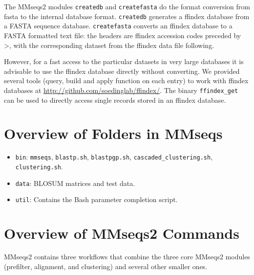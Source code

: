 \documentclass[11pt,a4paper]{scrreprt}
\begin{document}

The MMseqs2 modules \texttt{createdb} and \texttt{createfasta} do the format conversion from fasta to the internal database format. 
\texttt{createdb} generates a ffindex database from a FASTA sequence database. 
\texttt{createfasta} converts an ffindex database to a FASTA formatted text file: the headers are ffindex accession codes preceded by \textgreater, with the corresponding dataset from the ffindex data file following.

However, for a fast access to the particular datasets in very large databases it is advisable to use the ffindex database directly without converting. We provided several tools (query, build and apply function on each entry) to work with ffindex databases at \url{http://github.com/soedinglab/ffindex/}. The binary \texttt{ffindex\_get} can be used to directly access single records stored in an ffindex database.
\section{Overview of Folders in MMseqs}
\begin{itemize}
\item \texttt{bin}: \texttt{mmseqs}, \texttt{blastp.sh}, \texttt{blastpgp.sh}, \texttt{cascaded\_clustering.sh}, \texttt{clustering.sh}.
\item \texttt{data}: BLOSUM matrices and test data.
\item \texttt{util}: Contains the Bash parameter completion script.
\end{itemize}

\section{Overview of MMseqs2 Commands}
MMseqs2 contains three workflows that combine the three core MMseqs2 modules (prefilter, alignment, and clustering) and several other smaller ones. 
\end{document}
